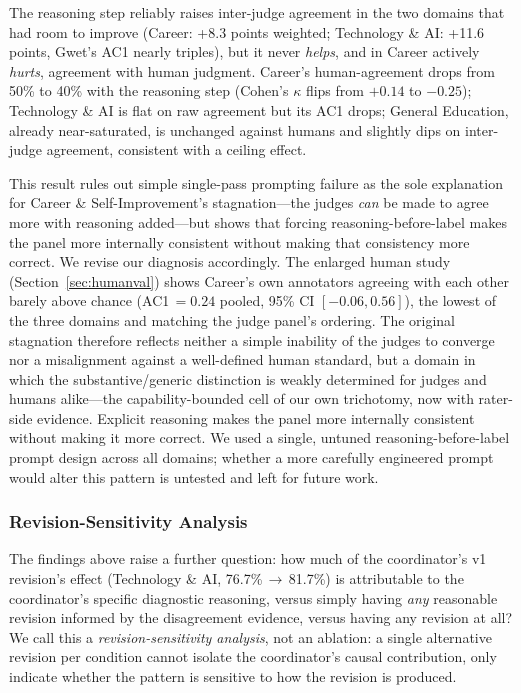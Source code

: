 \documentclass[11pt]{article}
\begin{document}
The reasoning step reliably raises inter-judge agreement in the two
domains that had room to improve (Career: +8.3 points weighted; Technology
\& AI: +11.6 points, Gwet's AC1 nearly triples), but it never \emph{helps},
and in Career actively \emph{hurts}, agreement with human judgment.
Career's human-agreement drops from 50\% to 40\% with the reasoning step
(Cohen's $\kappa$ flips from $+0.14$ to $-0.25$); Technology \& AI is flat
on raw agreement but its AC1 drops; General Education, already
near-saturated, is unchanged against humans and slightly dips on
inter-judge agreement, consistent with a ceiling effect.

This result rules out simple single-pass prompting failure as the sole
explanation for Career \& Self-Improvement's stagnation---the judges
\emph{can} be made to agree more with reasoning added---but shows that
forcing reasoning-before-label makes the panel more internally consistent
without making that consistency more correct. We revise our diagnosis accordingly. The enlarged human study
(Section~\ref{sec:humanval}) shows Career's own annotators agreeing with
each other barely above chance (AC1\,$=0.24$ pooled, 95\% CI
$[-0.06, 0.56]$), the lowest of the three domains and matching the judge
panel's ordering. The original stagnation therefore reflects neither a
simple inability of the judges to converge nor a misalignment against a
well-defined human standard, but a domain in which the
substantive/generic distinction is weakly determined for judges and
humans alike---the capability-bounded cell of our own trichotomy, now with
rater-side evidence. Explicit reasoning makes the panel more internally
consistent without making it more correct. We used a single, untuned
reasoning-before-label prompt design across all domains; whether a more
carefully engineered prompt would alter this pattern is untested and left
for future work.

\subsubsection{Revision-Sensitivity Analysis}
\label{sec:revisionsensitivity}

The findings above raise a further question: how much of the
coordinator's v1 revision's effect (Technology \& AI, 76.7\%\,$\to$\,81.7\%)
is attributable to the coordinator's specific diagnostic reasoning, versus
simply having \emph{any} reasonable revision informed by the disagreement
evidence, versus having any revision at all? We call this a
\emph{revision-sensitivity analysis}, not an ablation: a single alternative
revision per condition cannot isolate the coordinator's causal
contribution, only indicate whether the pattern is sensitive to how the
revision is produced.
\end{document}
